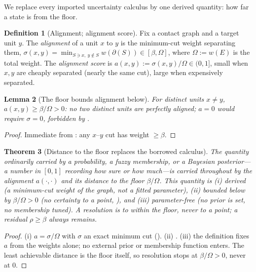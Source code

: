 \documentclass[twocolumn,11pt,a4paper]{article}
\theoremstyle{sup}
\newtheorem{theorem}{Theorem}[section]
\newtheorem{lemma}[theorem]{Lemma}
\theoremstyle{definition}
\newtheorem{definition}[theorem]{Definition}
\theoremstyle{remark}
\newcommand{\E}{E}
\newcommand{\wt}{w}
\newcommand{\flo}{\beta}
\newcommand{\cut}{\partial}
\newcommand{\str}{\sigma}
\newcommand{\res}{\rho}
\newcommand{\al}{a}
\newcommand{\Om}{\Omega}
\begin{document}
We replace every imported uncertainty calculus by one derived quantity: how far
a state is from the floor.

\begin{definition}[Alignment; alignment score]
\label{def:alignment}
Fix a contact graph and a target unit $y$. The \emph{alignment} of a unit $x$ to
$y$ is the minimum-cut weight separating them,
$\str(x,y)=\min_{S\ni x,\ y\notin S}\wt(\cut(S))\in[\flo,\Om]$, where
$\Om:=\wt(\E)$ is the total weight. The \emph{alignment score} is
$\al(x,y):=\str(x,y)/\Om\in(0,1]$, small when $x,y$ are cheaply separated
(nearly the same cut), large when expensively separated.
\end{definition}

\begin{lemma}[The floor bounds alignment below]
\label{lem:align-floor}
For distinct units $x\neq y$, $\al(x,y)\ge\flo/\Om>0$: no two distinct units are
perfectly aligned; $\al=0$ would require $\str=0$, forbidden by .
\end{lemma}

\begin{proof}
Immediate from : any $x$--$y$ cut has weight $\ge\flo$.
\end{proof}

\begin{theorem}[Distance to the floor replaces the borrowed calculus]
\label{thm:replace}
The quantity ordinarily carried by a probability, a fuzzy membership, or a
Bayesian posterior---a number in $[0,1]$ recording how sure or how much---is
carried throughout by the alignment $\al(\cdot,\cdot)$ and its distance to the
floor $\flo/\Om$. This quantity is \textup{(i)} \emph{derived} (a minimum-cut
weight of the graph, not a fitted parameter), \textup{(ii)} \emph{bounded below}
by $\flo/\Om>0$ (no certainty to a point, ), and
\textup{(iii)} \emph{parameter-free} (no prior is set, no membership tuned).
A resolution is to within the floor, never to a point; a residual $\res\ge\flo$
always remains.
\end{theorem}

\begin{proof}
(i) $\al=\str/\Om$ with $\str$ an exact minimum cut (). (ii)
. (iii) the definition fixes $\al$ from the weights alone;
no external prior or membership function enters. The least achievable distance
is the floor itself, so resolution stops at $\flo/\Om>0$, never at $0$.
\end{proof}
\end{document}

